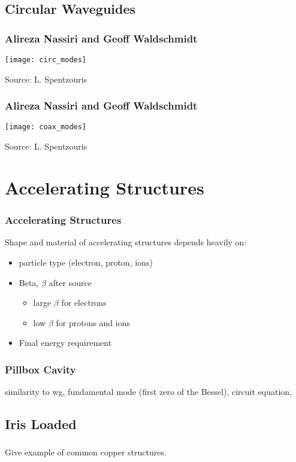 \documentclass[professionalfonts,t]{beamer}
\begin{document}
\subsection{Circular Waveguides}
\begin{frame}
\frametitle{Alireza Nassiri and Geoff Waldschmidt}
\centering
	\texttt{[image: circ\_modes]}
	
	Source: L. Spentzouris
\end{frame}
\begin{frame}
\frametitle{Alireza Nassiri and Geoff Waldschmidt}
\centering
	\texttt{[image: coax\_modes]}
	\vspace{-1em}
	
	Source: L. Spentzouris
\end{frame}


\section{Accelerating Structures}
\begin{frame}
\frametitle{Accelerating Structures}
Shape and material of accelerating structures depends heavily on: 
\begin{itemize}
	\item particle type (electron, proton, ions)
	\item Beta, $\beta$ after source
	\begin{itemize}
		\item large $\beta$ for electrons
		\item low $\beta$ for protons and ions
	\end{itemize}
	\item Final energy requirement
\end{itemize}
\end{frame}

\begin{frame}
	\frametitle{Pillbox Cavity}
	similarity to wg, fundamental mode (first zero of the Bessel), 
	circuit equation, 
\end{frame}


\subsection{Iris Loaded}
\begin{frame}
	\frametitle{}
	Give example of common copper structures. 
\end{frame}
\end{document}
